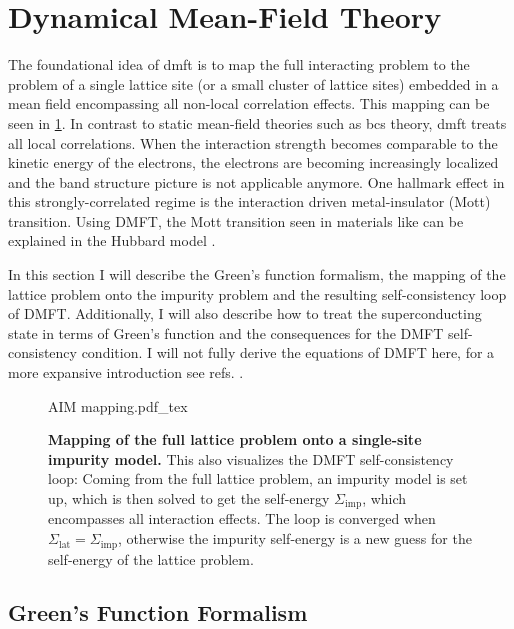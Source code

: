 \documentclass[../notes.tex]{subfiles}
\begin{document}
\section{Dynamical Mean-Field Theory}\label{sec:Dynamical Mean-Field Theory}

The foundational idea of \acrfull{dmft} is to map the full interacting problem to the problem of a single lattice site (or a small cluster of lattice sites) embedded in a mean field encompassing all non-local correlation effects.
This mapping can be seen in \cref{fig:DMFT AIM mapping}.
In contrast to static mean-field theories such as \acrshort{bcs} theory, \acrshort{dmft} treats all local correlations.
When the interaction strength becomes comparable to the kinetic energy of the electrons, the electrons are becoming increasingly localized and the band structure picture is not applicable anymore.
One hallmark effect in this strongly-correlated regime is the interaction driven metal-insulator (Mott) transition.
Using DMFT, the Mott transition seen in materials like  \cite{mcwhanMottTransitionCrDoped1969} can be explained in the Hubbard model \cite{rozenbergMottHubbardTransitionInfinite1994}.
	
In this section I will describe the Green's function formalism, the mapping of the lattice problem onto the impurity problem and the resulting self-consistency loop of DMFT.
Additionally, I will also describe how to treat the superconducting state in terms of Green's function and the consequences for the DMFT self-consistency condition.
I will not fully derive the equations of DMFT here, for a more expansive introduction see refs. \cite{pavariniDynamicalMeanfieldTheory2022, georgesDynamicalMeanfieldTheory1996, colemanIntroductionManyBodyPhysics2015, bruusManyBodyQuantumTheory2004}.

\begin{figure}[t]
	\centering
	{AIM mapping.pdf_tex}
	\caption{\textbf{Mapping of the full lattice problem onto a single-site impurity model.} This also visualizes the DMFT self-consistency loop: Coming from the full lattice problem, an impurity model is set up, which is then solved to get the self-energy \(\Sigma_{\mathrm{imp}}\), which encompasses all interaction effects. The loop is converged when \(\Sigma_{\mathrm{lat}} = \Sigma_{\mathrm{imp}}\), otherwise the impurity self-energy is a new guess for the self-energy of the lattice problem.}
	\label{fig:DMFT AIM mapping}
\end{figure}

\subsection*{Green's Function Formalism}
\end{document}
